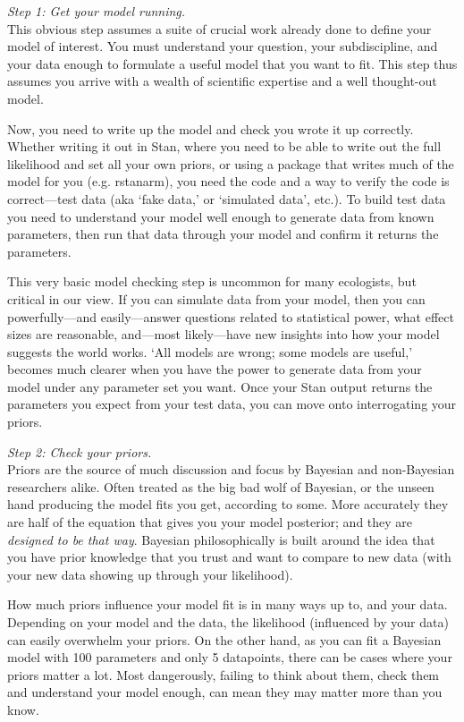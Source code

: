 \documentclass[11pt]{article}
\begin{document}
\emph{Step 1: Get your model running.} \\
This obvious step assumes a suite of crucial work already done to define your model of interest. You must understand your question, your subdiscipline, and your data enough to formulate a useful model that you want to fit. This step thus assumes you arrive with a wealth of scientific expertise and a well thought-out model. 

Now, you need to write up the model and check you wrote it up correctly. Whether writing it out in \textsf{Stan}, where you need to be able to write out the full likelihood and set all your own priors, or using a package that writes much of the model for you (e.g. \textsf{rstanarm}), you need the code and a way to verify the code is correct---test data (aka `fake data,' or `simulated data', etc.). To build test data you need to understand your model well enough to generate data from known parameters, then run that data through your model and confirm it returns the parameters. 

This very basic model checking step is uncommon for many ecologists, but critical in our view. If you can simulate data from your model, then you can powerfully---and easily---answer questions related to statistical power, what effect sizes are reasonable, and---most likely---have new insights into how your model suggests the world works. `All models are wrong; some models are useful,' becomes much clearer when you have the power to generate data from your model under any parameter set you want. Once your \textsf{Stan} output returns the parameters you expect from your test data, you can move onto interrogating your priors. 

\emph{Step 2: Check your priors.} \\
Priors are the source of much discussion and focus by Bayesian and non-Bayesian researchers alike. Often treated as the big bad wolf of Bayesian, or the unseen hand producing the model fits you get, according to some. More accurately they are half of the equation that gives you your model posterior; and they are \emph{designed to be that way}. Bayesian philosophically is built around the idea that you have prior knowledge that you trust and want to compare to new data (with your new data showing up through your likelihood).

How much priors influence your model fit is in many ways up to, and your data. Depending on your model and the data, the likelihood (influenced by your data) can easily overwhelm your priors.  On the other hand, as you can fit a Bayesian model with 100 parameters and only 5 datapoints, there can be cases where your priors matter a lot. Most dangerously, failing to think about them, check them and understand your model enough, can mean they may matter more than you know. 
\end{document}
